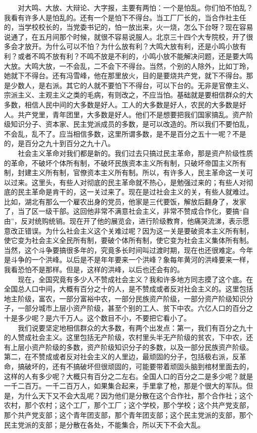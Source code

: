 \documentclass[cn,11pt,chinese]{elegantbook}
\begin{document}
　　对大鸣、大放、大辩论、大字报，主要有两怕：一个是怕乱。你们怕不怕乱？我看有许多人是怕乱的。还有一个是怕下不得台。当工厂厂长的，当合作社主任的，当学校校长的，当党委书记的，怕一放出来，火一烧，怎么下台呀？现在容易说通了，在五月间那个时候，就很不容易说服人。北京三十四个大专院校，开了很多会才放开。为什么可以不怕？为什么放有利？大鸣大放有利，还是小鸣小放有利？或者不鸣不放有利？不鸣不放是不利的，小鸣小放不能解决问题，还是要大鸣大放。大鸣大放，一不会乱，二不会下不得台。当然，个别的人除外，比如丁玲，她就下不得台。还有冯雪峰，他在那里放火，目的是要烧共产党，就下不得台。那是少数人，是右派。其它的人就不要怕下不得台，可以下台的。无非是官僚主义、宗派主义、主观主义之类的毛病，有则改之，不应当怕。基础就是要相信群众的大多数，相信人民中间的大多数是好人。工人的大多数是好人，农民的大多数是好人。共产党里，青年团里，大多数是好人。他们不是想要把我们国家搞乱。资产阶级知识分子、资本家、民主党派成员的多数，是可以改造的。所以我们不要怕乱，不会乱，乱不了。应当相信多数，这里所谓多数，是不是百分之五十一呢？不是的，是百分之九十到百分之九十八。\\
　　社会主义革命对我们都是新的。我们过去只搞过民主革命，那是资产阶级性质的革命，不破坏个体所有制，不破坏民族资本主义所有制，只破坏帝国主义所有制，封建主义所有制，官僚资本主义所有制。所以，有许多人，民主革命这一关可以过来。这里头，有些人对彻底的民主革命就不热心，是勉强过来的；有些人对彻底的民主革命是肯干的，这一关过来了。现在是过社会主义的关，有些人就难过。比如，湖北有那么一个雇农出身的党员，他家是三代要饭，解放后翻身了，发家了，当了区一级干部。这回他非常不满意社会主义，非常不赞成合作化，要搞“自由”，反对统购统销。现在开了他的展览会，进行阶级教育，他痛哭流涕，表示愿意改正错误。为什么社会主义这个关难过呢？因为这一关是要破资本主义所有制，使它变为社会主义全民所有制，要破个体所有制，使它变为社会主义集体所有制。当然，这个斗争要搞很多年的，究竟多长时间叫过渡时期，现在也还很难定。今年是斗争的一个洪峰。以后是不是年年要来一个洪峰？象每年黄河的洪峰要来一样，我看恐怕不是那样。但是，这样的洪峰，以后也还会有的。\\
　　现在，全国究竟有多少人不赞成社会主义？我和许多地方同志摸了这个底。在全国总人口中间，大概有百分之十的人，是不赞成或者反对社会主义的。这里包括地主阶级，富农，一部分富裕中农，一部分民族资产阶级，一部分资产阶级知识分子，一部分城市上层小资产阶级，甚至个别的工人、贫下中农。六亿人口的百分之十是多少呢？是六千万人。这个数目不小，不要把它看小了。\\
　　我们说要坚定地相信群众的大多数，有两个出发点：第一，我们有百分之九十的人赞成社会主义。这里包括无产阶级，农村里头半无产阶级的贫农，下中农，还有上层小资产阶级的多数，资产阶级知识分子的多数，以及一部分民族资产阶级。第二，在不赞成或者反对社会主义的人里边，最顽固的分子，包括极右派，反革命，搞破坏的，还有不搞破坏但很顽固的，可能要带着顽固头脑到棺材里面去的，这样的人有多少呢？大概只有百分之二左右。全国人口的百分之二是多少呢？就是一千二百万。一千二百万人，如果集合起来，手里拿了枪，那是个很大的军队。但是，为什么天下又不会大乱呢？因为他们是分散在这个合作社，那个合作社；这个农村，那个农村；这个工厂，那个工厂；这个学校，那个学校；这个共产党支部，那个共产党支部；这个青年团支部，那个青年团支部；这个民主党派的支部，那个民主党派的支部；是分散在各处，不能集合，所以天下不会大乱。\\
\end{document}
